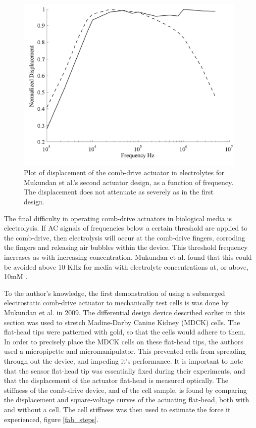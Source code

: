 \begin{figure}[htpb]
    \includegraphics[width=\linewidth]{Chapter2/Figs/Raster/displacementAttenuationDesgn2.png}
    \caption{Plot of displacement of the comb-drive actuator in electrolytes for Mukundan et al.'s second actuator design, as a function of frequency. The displacement does not attenuate as severely as in the first design.} \label{vik_design_2}
\end{figure}

The final difficulty in operating comb-drive actuators in biological media is electrolysis. If AC signals of frequencies below a certain threshold are applied to the comb-drive, then electrolysis will occur at the comb-drive fingers, corroding the fingers and releasing air bubbles within the device. This threshold frequency increases as with increasing concentration. Mukundan et al. found that this could be avoided above 10 KHz for media with electrolyte concentrations at, or above, 10mM \cite{Mukundan2009}.

To the author's knowledge, the first demonstration of using a submerged electrostatic comb-drive actuator to mechanically test cells is was done by Mukundan et al. in 2009\cite{Mukundan2009}. The differential design device described earlier in this section was used to stretch Madine-Darby Canine Kidney (MDCK) cells. The flat-head tips were patterned with gold, so that the cells would adhere to them. In order to precisely place the MDCK cells on these flat-head tips, the authors used a micropipette and micromanipulator. This prevented cells from spreading through out the device, and impeding it's performance. It is important to note that the sensor flat-head tip was essentially fixed during their experiments, and that the displacement of the actuator flat-head is measured optically. The stiffness of the comb-drive device, and of the cell sample, is found by comparing the displacement and square-voltage curves of the actuating flat-head, both with and without a cell. The cell stiffness was then used to estimate the force it experienced, figure \ref{fab_steps}.

